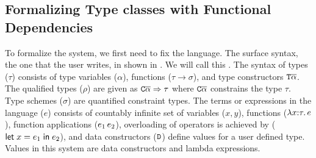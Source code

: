 \documentclass[format=acmsmall,manuscript,review,screen,nonacm,margin=1in,11pt]{acmart}
\begin{document}
\subsection{Formalizing Type classes with Functional Dependencies}\label{subsec:tc-formal}
To formalize the system, we first need to fix the language.
The surface syntax, the one that the user writes, in shown in .
We will call this \TCFD{}.
The syntax of types ($\tau$) consists of  type variables ($\alpha$),
functions ($\tau\to\sigma$), and type constructors $\texttt{T}\overline{\alpha}$.
The qualified types ($\rho$) are given as $\texttt{C}\overline{\alpha}\Rightarrow\tau$
where $\texttt{C}\overline{\alpha}$ constrains the type $\tau$. Type schemes ($\sigma$) are quantified constraint types.
The terms or expressions in the language ($e$) consists of countably
infinite set of variables ($x, y$), functions ($\lambda x{:}\tau.\, e$),
function applications ($e_1\, e_2$), overloading of operators is achieved by ($\mathsf{let}\;x = e_1\;\mathsf{in}\;e_2$), and
data constructors ($\texttt{D}$) define values for a user defined type.
Values in this system are data constructors and lambda expressions.
\end{document}
